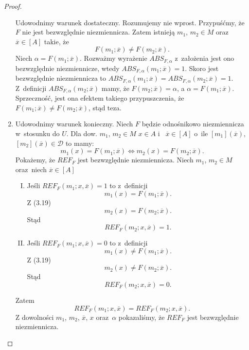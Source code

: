 \documentclass[12pt,a4paper]{report}
\newcommand{\domkniecie}[1]{\left[ {#1} \right] }
\begin{document}
\begin{proof}
\begin{enumerate}
Udowodnimy warunek dostateczny. Rozumujemy nie wprost. Przypuśćmy, że $F$ nie jest bezwzględnie niezmiennicza. Zatem istnieją $m_1$, $m_2 \in M$ oraz~$\overline{x} \in \domkniecie{A}$ takie, że
$$
F(m_1;\overline{x})\ne F(m_2;\overline{x}).
$$
Niech $\alpha=F(m_1;\overline{x})$. Rozważmy wyrażenie $ABS_{F,\alpha}$  z~założenia jest ono bezwzględnie niezmiennicze, wtedy $ABS_{F,\alpha}(m_1;\overline{x})=1$. Skoro jest bezwzględnie niezmiennicza  to $ABS_{F,\alpha}(m_1;\overline{x})=ABS_{F,\alpha}(m_2;\overline{x})=1$. Z~definicji $ABS_{F,\alpha}(m_2;\overline{x})$ mamy, że $F(m_2;\overline{x})=\alpha$, a $\alpha=F(m_1;\overline{x})$. Sprzeczność, jest ona efektem takiego przypuszczenia, że $F(m_1;\overline{x})\ne F(m_2;\overline{x})$, stąd teza.
\item
Udowodnimy warunek konieczny. Niech $F$ będzie odnośnikowo niezmiennicza w~stosunku do $U$. Dla dow. $m_{1}$, $m_{2} \in M$ $x \in A$ i~ $\overline{x} \in \domkniecie{A}$ o~ile  $\domkniecie{m_1}(\overline{x})$, $\domkniecie{m_2}(\overline{x})\in \mathcal{D}$ to mamy:
\begin{equation}
 m_{1}(x)=F(m_{1};\overline{x}) \iff m_{2}(x)=F(m_{2};\overline{x}).
\end{equation}
Pokażemy, że $REF_{F}$ jest bezwzględnie niezmiennicza. Niech $m_1$, $m_2 \in M$ oraz~niech $\overline{x} \in \domkniecie{A}$ 
\begin{enumerate}[I.]
\item
Jeśli $REF_{F}(m_1;x,\overline{x})=1$ to z~definicji
$$
m_1(x)=F(m_1;\overline{x}).
$$
Z (3.19) 
$$
m_2(x)=F(m_2;\overline{x}).
$$
Stąd 
$$
REF_{F}(m_2;x,\overline{x})=1.
$$
\item
Jeśli $REF_{F}(m_1;x,\overline{x})=0$ to z~definicji 
$$
m_1(x)\ne F(m_1;\overline{x}).
$$
Z (3.19)
$$
m_2(x)\ne F(m_2;\overline{x}).
$$
Stąd
$$
REF_{F}(m_2;x,\overline{x})=0.
$$
\end{enumerate}
Zatem 
$$
REF_{F}(m_1;x,\overline{x})=REF_{F}(m_2;x,\overline{x}).
$$
Z dowolności $m_1$, $m_2$, $\overline{x}$, $x$ oraz~$\alpha$ pokazaliśmy, że $REF_{F}$ jest bezwzględnie niezmiennicza.


\end{enumerate}
\end{proof}
\end{document}
